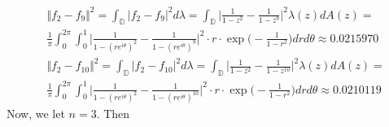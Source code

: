 \documentclass[12pt]{article}
\begin{document}
\begin{align}
&\Vert f_2 - f_{9}\Vert^2 = \int_\mathbb{D} \vert f_2 - f_{9} \vert^2 d\lambda = \int_\mathbb{D} \bigg\vert \frac{1}{1-z^2} - \frac{1}{1-z^{9}} \bigg\vert^2 \lambda(z) dA(z) =\\
&\frac{1}{\pi} \int_0^{2\pi} \int_0^1 \bigg\vert \frac{1}{1-(re^{i\theta})^2} - \frac{1}{1-(re^{i\theta})^{9}} \bigg\vert^2 \cdot r \cdot \exp\bigg(-\frac{1}{1-r^2}\bigg) dr d\theta \approx 0.0215970 \\
&\Vert f_2 - f_{10}\Vert^2 = \int_\mathbb{D} \vert f_2 - f_{10} \vert^2 d\lambda = \int_\mathbb{D} \bigg\vert \frac{1}{1-z^2} - \frac{1}{1-z^{10}} \bigg\vert^2 \lambda(z) dA(z) =\\
&\frac{1}{\pi} \int_0^{2\pi} \int_0^1 \bigg\vert \frac{1}{1-(re^{i\theta})^2} - \frac{1}{1-(re^{i\theta})^{10}} \bigg\vert^2 \cdot r \cdot \exp\bigg(-\frac{1}{1-r^2}\bigg) dr d\theta \approx 0.0210119
\end{align} Now, we let $n = 3$. Then
\end{document}
